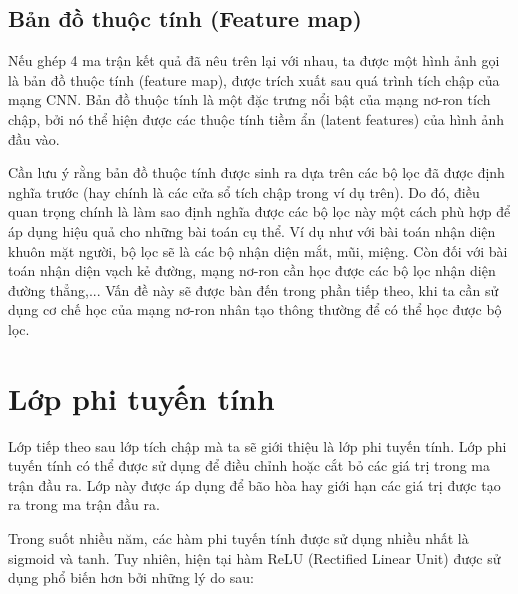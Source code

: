 \documentclass[a4paper]{article}
\begin{document}
\subsection{Bản đồ thuộc tính (Feature map)}
Nếu ghép 4 ma trận kết quả đã nêu trên lại với nhau, ta được một hình ảnh gọi là bản đồ thuộc tính (feature map), được trích xuất sau quá trình tích chập của mạng CNN. Bản đồ thuộc tính là một đặc trưng nổi bật của mạng nơ-ron tích chập, bởi nó thể hiện được các thuộc tính tiềm ẩn (latent features) của hình ảnh đầu vào.

Cần lưu ý rằng bản đồ thuộc tính được sinh ra dựa trên các bộ lọc đã được định nghĩa trước (hay chính là các cửa sổ tích chập trong ví dụ trên). Do đó, điều quan trọng chính là làm sao định nghĩa được các bộ lọc này một cách phù hợp để áp dụng hiệu quả cho những bài toán cụ thể. Ví dụ như với bài toán nhận diện khuôn mặt người, bộ lọc sẽ là các bộ nhận diện mắt, mũi, miệng. Còn đối với bài toán nhận diện vạch kẻ đường, mạng nơ-ron cần học được các bộ lọc nhận diện đường thẳng,... Vấn đề này sẽ được bàn đến trong phần tiếp theo, khi ta cần sử dụng cơ chế học của mạng nơ-ron nhân tạo thông thường để có thể học được bộ lọc.

\section{Lớp phi tuyến tính}

\vspace{0.35cm}

Lớp tiếp theo sau lớp tích chập mà ta sẽ giới thiệu là lớp phi tuyến tính. Lớp phi tuyến tính có thể được sử dụng để điều chỉnh hoặc cắt bỏ các giá trị trong ma trận đầu ra. Lớp này được áp dụng để bão hòa hay giới hạn các giá trị được tạo ra trong ma trận đầu ra. \par

\vspace{0.35cm}

Trong suốt nhiều năm, các hàm phi tuyến tính được sử dụng nhiều nhất là sigmoid và tanh. Tuy nhiên, hiện tại hàm ReLU (Rectified Linear Unit) được sử dụng phổ biến hơn bởi những lý do sau:
\end{document}

